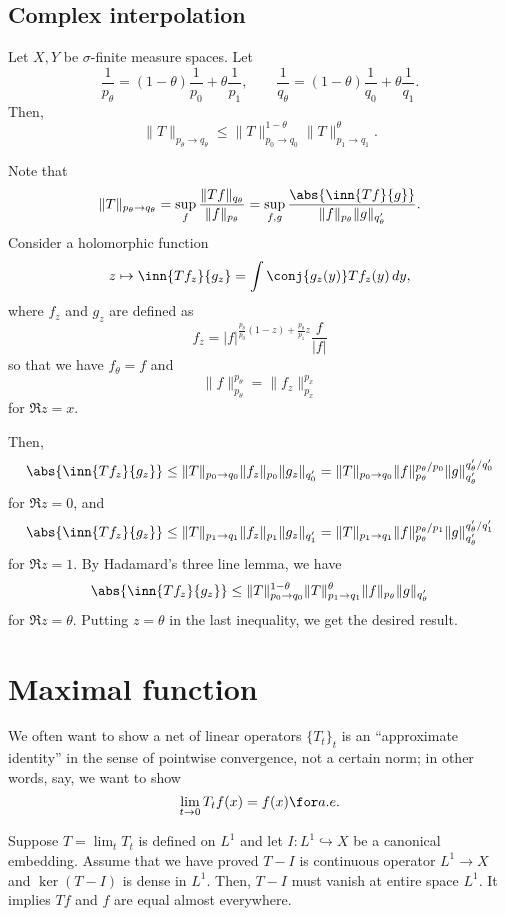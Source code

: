 \documentclass{../crs}
\begin{document}
\subsection{Complex interpolation}
\begin{thm}
Let $X,Y$ be $\sigma$-finite measure spaces.
Let
\[\frac1{p_\theta}=(1-\theta)\frac1{p_0}+\theta\frac1{p_1},\qquad\frac1{q_\theta}=(1-\theta)\frac1{q_0}+\theta\frac1{q_1}.\]
Then,
\[\|T\|_{p_\theta\to q_\theta}\le\|T\|_{p_0\to q_0}^{1-\theta}\|T\|_{p_1\to q_1}^\theta.\]
\end{thm}
\begin{pf}
Note that
\[\|T\|_{p_\theta\to q_\theta}=\sup_f\frac{\|Tf\|_{q_\theta}}{\|f\|_{p_\theta}}=\sup_{f,g}\frac{\abs{\inn{Tf}{g}}}{\|f\|_{p_\theta}\|g\|_{q'_\theta}}.\]
Consider a holomorphic function
\[z\mapsto\inn{Tf_z}{g_z}=\int\conj{g_z(y)}Tf_z(y)\,dy,\]
where $f_z$ and $g_z$ are defined as
\[f_z=|f|^{\frac{p_\theta}{p_0}(1-z)+\frac{p_\theta}{p_1}z}\frac f{|f|}\]
so that we have $f_\theta=f$ and
\[\|f\|_{p_\theta}^{p_\theta}=\|f_z\|_{p_x}^{p_x}\]
for $\Re z=x$.

Then,
\[\abs{\inn{Tf_z}{g_z}}\le\|T\|_{p_0\to q_0}\|f_z\|_{p_0}\|g_z\|_{q'_0}=\|T\|_{p_0\to q_0}\|f\|_{p_\theta}^{p_\theta/p_0}\|g\|_{q'_\theta}^{q'_\theta/q'_0}\]
for $\Re z=0$, and
\[\abs{\inn{Tf_z}{g_z}}\le\|T\|_{p_1\to q_1}\|f_z\|_{p_1}\|g_z\|_{q'_1}=\|T\|_{p_1\to q_1}\|f\|_{p_\theta}^{p_\theta/p_1}\|g\|_{q'_\theta}^{q'_\theta/q'_1}\]
for $\Re z=1$.
By Hadamard's three line lemma, we have
\[\abs{\inn{Tf_z}{g_z}}\le\|T\|_{p_0\to q_0}^{1-\theta}\|T\|_{p_1\to q_1}^\theta\|f\|_{p_\theta}\|g\|_{q'_\theta}\]
for $\Re z=\theta$.
Putting $z=\theta$ in the last inequality, we get the desired result.
\end{pf}









\section{Maximal function}

We often want to show a net of linear operators $\{T_t\}_t$ is an ``approximate identity'' in the sense of pointwise convergence, not a certain norm; in other words, say, we want to show
\[\lim_{t\to0}T_tf(x)=f(x)\for a.e.\]

Suppose $T=\lim_tT_t$ is defined on $L^1$ and let $I:L^1\hookrightarrow X$ be a canonical embedding.
Assume that we have proved $T-I$ is continuous operator $L^1\to X$ and $\ker(T-I)$ is dense in $L^1$.
Then, $T-I$ must vanish at entire space $L^1$.
It implies $Tf$ and $f$ are equal almost everywhere.
\end{document}

